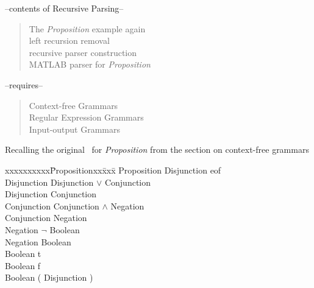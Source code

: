 



\begin{center}
\begin{small}

\noindent --contents of Recursive Parsing--
\begin{quote}
\raggedright
The {\em Proposition} example again\\
left recursion removal\\
recursive parser construction\\
MATLAB parser for {\em Proposition}\\
\end{quote}

\noindent --requires--
\begin{quote}
\raggedright
  Context-free Grammars\\
  Regular Expression Grammars\\
  Input-output Grammars
\end{quote}

\end{small}
\end{center}

\vspace{1em}


\vspace{1em}

\noindent Recalling the original \cfg\ for {\em Proposition\/} from
the section on context-free grammars

\begin{samepage}
\begin{em}
\begin{tabbing}
xxxxxxxxxx\=Propositionxx\=xxx\=\kill
\>Proposition \>\la\> Disjunction {\rm eof}              \\        
\>Disjunction \>\la\> Disjunction $\vee$ Conjunction     \\
\>Disjunction \>\la\> Conjunction                        \\
\>Conjunction \>\la\> Conjunction $\wedge$ Negation      \\
\>Conjunction \>\la\> Negation                           \\
\>Negation    \>\la\> $\neg$ Boolean                     \\
\>Negation    \>\la\> Boolean                            \\
\>Boolean     \>\la\> {\rm t}                            \\
\>Boolean     \>\la\> {\rm f}                            \\
\>Boolean     \>\la\> {\rm(} Disjunction {\rm)}
\end{tabbing}
\end{em}
\end{samepage}

